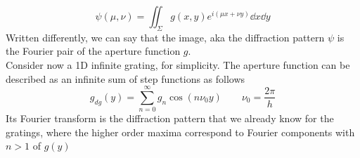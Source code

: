 \documentclass[../electromagnetism.tex]{subfiles}
\begin{document}
\begin{equation}
	\psi(\mu, \nu)=\iint_\Sigma g(x, y)e^{i\left( \mu x+\nu y \right)}\dd{x}\dd{y}
	\label{eq:ftaperture.fourier}
\end{equation}
Written differently, we can say that the image, aka the diffraction pattern $\psi$ is the Fourier pair of the aperture function $g$.\\
Consider now a 1D infinite grating, for simplicity. The aperture function can be described as an infinite sum of step functions as follows
\begin{equation}
	g_{dg}(y)=\sum_{n=0}^\infty g_n\cos(n\nu_0y)\qquad\nu_0=\frac{2\pi}{h}
	\label{eq:gratingaperturefn.fdiff}
\end{equation}
Its Fourier transform is the diffraction pattern that we already know for the gratings, where the higher order maxima correspond to Fourier components with $n>1$ of $g(y)$
\end{document}
